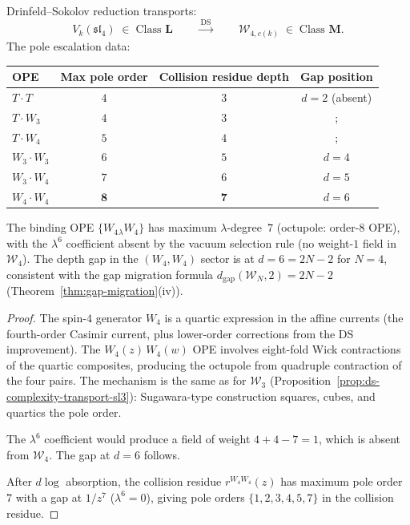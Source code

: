 \begin{proposition}
\label{prop:ds-complexity-transport-sl4}
%
%
Drinfeld--Sokolov reduction transports:
\[
V_k(\mathfrak{sl}_4) \;\in\; \text{Class } \mathbf{L}
\qquad\xrightarrow{\;\mathrm{DS}\;}\qquad
\mathcal{W}_{4,c(k)} \;\in\; \text{Class } \mathbf{M}.
\]
The pole escalation data:
\begin{center}
\small
\renewcommand{\arraystretch}{1.3}
\begin{tabular}{lccc}
\toprule
\textbf{OPE} & \textbf{Max pole order}
 & \textbf{Collision residue depth}
 & \textbf{Gap position} \\
\midrule
$T \cdot T$ & $4$ & $3$ & $d = 2$ \textup{(}absent\textup{)} \\
$T \cdot W_3$ & $4$ & $3$ &; \\
$T \cdot W_4$ & $5$ & $4$ &; \\
$W_3 \cdot W_3$ & $6$ & $5$ & $d = 4$ \\
$W_3 \cdot W_4$ & $7$ & $6$ & $d = 5$ \\
$W_4 \cdot W_4$ & $\mathbf{8}$ & $\mathbf{7}$ & $d = 6$ \\
\bottomrule
\end{tabular}
\end{center}
The binding OPE $\{W_4{}_\lambda W_4\}$ has maximum $\lambda$-degree~$7$
\textup{(}octupole: order-$8$ OPE\textup{)}, with the $\lambda^6$ coefficient
absent by the vacuum selection rule
\textup{(}no weight-$1$ field in $\mathcal{W}_4$\textup{)}.
The depth gap in the $(W_4, W_4)$ sector is at
$d = 6 = 2N - 2$ for $N = 4$, consistent with the gap migration
formula $d_{\mathrm{gap}}(\mathcal{W}_N, 2) = 2N - 2$
\textup{(}Theorem~\textup{\ref{thm:gap-migration}(iv))}.
\end{proposition}

\begin{proof}
The spin-$4$ generator $W_4$ is a quartic expression in the affine
currents (the fourth-order Casimir current, plus lower-order corrections
from the DS improvement). The $W_4(z)\,W_4(w)$ OPE involves
eight-fold Wick contractions of the quartic composites, producing
the octupole from quadruple contraction of the four pairs.
The mechanism is the same as for $\mathcal{W}_3$
(Proposition~\ref{prop:ds-complexity-transport-sl3}): Sugawara-type
construction squares, cubes, and quartics the pole order.

The $\lambda^6$ coefficient would produce a field of weight
$4 + 4 - 7 = 1$, which is absent from $\mathcal{W}_4$.
The gap at $d = 6$ follows.

After $d\log$ absorption, the collision residue
$r^{W_4 W_4}(z)$ has maximum pole order~$7$ with a gap at
$1/z^7$ ($\lambda^6 = 0$), giving pole orders
$\{1, 2, 3, 4, 5, 7\}$ in the collision residue.
\end{proof}

